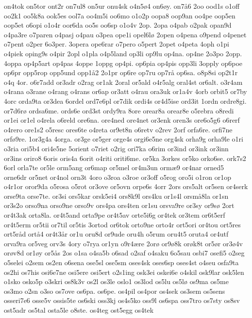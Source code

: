 on4tok
on5tor
ont2r
on7ul8
on5ur
onu4sk
o4n5^^f84
on6^^f8y.
on7^^e56
2oo
ood1s
o1off
oo2k1
oo5k8a
ook5es
ool7a
oo4m5i
oo6mo
o1o2p
oopa8
oop9an
oo4pe
oop5en
oop5et
o6opi
o1o4r
oor6da
oo5s
oo6sp
o1o4v
2op.
2opa
o4pab
o2pak
opan9d
o4pa3re
o7paren
o4pasj
o4pau
o3pea
ope1i
opel6l^^f8
2open
o4pena
o9pend
o4penet
o7pent
o2per
6o3per.
3opera
ope6rar
o7pero
o5pert
2opet
o4peta
4oph
o1pi
o4piek
oping9s
o4pir
2opl
o1pla
o4p5land
op3li
op9lu
op4na.
op4ne
2o3po
2opp.
4oppa
op4p5art
op4pas
4oppe
1oppg
op4pi.
op6pia
op4pis
opp3li
3opply
op6poe
op6pr
opp5rop
opp5und
opp1^^e52
2o1pr
op6re
op7ru
op7r^^e5
op6sa.
o8p8si
op2t1r
o4q
4or.
o6r7add
or3adr
o2rag
or1ak
2oral
or5ald
o4r5alg
oral4st
or6alt.
o3r4am
o4rana
o3rane
o4rang
o4rans
or6ap
or3att
o4rau
ora3uk
or1a4v
4orb
orbit5
or7by
4orc
orda9ta
or3dea
6ordel
ord7e6pl
or7dik
ordi4s
or4d5ise
ord3it
1ordn
ordre8gi.
or7d6r^^f8
ordsa6me.
ords6e
ord3st
ordy9ra
8ore
orear8a
orear8e
o5rebra
o8redi
or1ei
or1el
o4rela
o6reld
ore6na.
ore4ned
ore4net
or3enk
oren3s
ore6o5g6
o6rerf
o4rero
ore1s2
o5resc
ores6te
o4reta
or9et8n
o6retv
o2rev
2orf
orfa6re.
orfi7ne
orf^^f89re.
1or3g4a
4orga.
or3ge
or5ger
orge4s
orgi6e5ne
org4sk
orha9g
orha9le
o1ri
o3ria
ori5b4
ori4e5ne
5orient
o7riet
o2rig
ori7ka
o6rim
or3ind
or3ink
or3inn
or3ins
oriro8
6oris
oris4a
6orit
o4riti
oriti6me.
or5ka
3orkes
or5ko
orko6se.
ork7s2
6orl
orla7te
or5le
orm5ang
or6map
or5mel
or4m3un
orm^^e69
or4nar
orned5
orne6dr
or5net
or4nol
orn3t
4oro
o3roa
o3roe
or3off
o5rog
oro5i
o1ron
or1op
o4r1or
oror9da
o5rosa
o5rot
or3ove
or5ovn
orpe6s
4orr
2ors
ors5alt
or5sen
or4serk
orse9ta
orse7te.
or3si
ors5kar
orsk5ei4
ors8k9l
ors4ku
or1s4l
orsm^^e58la
or1sn
or3s2o
orso9na
orso9ne
orso9v
ors4pa
ors4ten
or1su
orsva9re
or3sy
or9s^^f8
2ort
or4t3ak
orta8la.
or4t5and
orta9pe
or4t5av
orte5i6g
or4tek
or3tem
or6t5erf
or4t5erm
or5tii
or7til
or5tis
3ortod
or6tok
orto9ne
orto4r
ort5ori
or4tou
ort5res
ort5r^^e5d
ort^^e54
or4t3^^e5r
or1u
oru8d
or9ude
oru4h
o5rum
oru4t5
oruta4
or4utf
orva9ra
or5veg
orv3s
4ory
o7rya
or1yn
o9r4^^e6re
2or^^f8
or9^^f88k
or^^f8k8t
or5^^f8r
or3^^f84v
or^^f8v8d
or1^^f8y
or5^^e5s
2os
o1sa
o4sa5b
o6sad
o2saf
o4saku
6o5sau
osbi7
osefi5
o2seg
o5selei
o2sem
os2en
o6sena
ose5sl
ose5sm
oses4sk
oses6sp
oses4st
o4seu
osfa9ta
os2hi
os7his
osi6e7ne
osi5ere
osi5ert
o2s1ing
osk3ei
oskei6e
o4skil
osk9lar
osk5len
o1sko
osko5p
o3skri
os8k3v
os2l
os3le
oslo1
os3lod
os5lu
os5l^^f8
os9ma
os5me
os3mo
o2sn
o3so
os7ove
os6pa.
os6pe.
os4pil
os4por
os4sek
os3sem
os5sens
osseri7e6
osse5v
ossis5te
os6ski
oss3kj
os4s5ko
oss9l
os6spa
oss7tro
os7sty
os8sv
ost5adr
os5tal
osta5le
o8ste.
os4teg
ost5egg
os4tek
